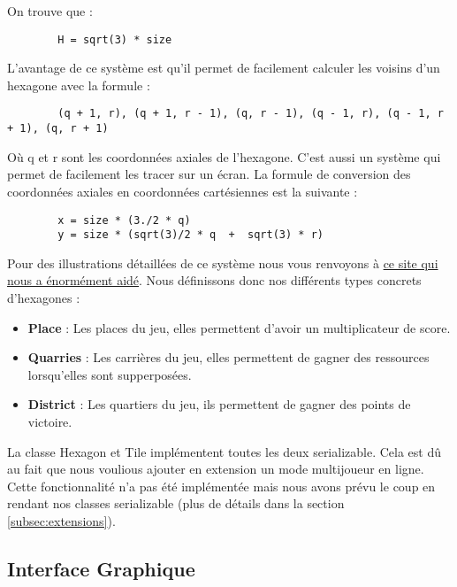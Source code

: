 \documentclass{article}
\begin{document}
    On trouve que :
    \begin{verbatim}
        H = sqrt(3) * size
    \end{verbatim}
    L'avantage de ce système est qu'il permet de facilement calculer les voisins d'un hexagone avec la formule :
    \begin{verbatim}
        (q + 1, r), (q + 1, r - 1), (q, r - 1), (q - 1, r), (q - 1, r + 1), (q, r + 1)
    \end{verbatim}
    Où q et r sont les coordonnées axiales de l'hexagone.
    C'est aussi un système qui permet de facilement les tracer sur un écran.
    La formule de conversion des coordonnées axiales en coordonnées cartésiennes est la suivante :
    \begin{verbatim}
        x = size * (3./2 * q)
        y = size * (sqrt(3)/2 * q  +  sqrt(3) * r)
    \end{verbatim}
    Pour des illustrations détaillées de ce système nous vous renvoyons à \href{https://www.redblobgames.com/grids/hexagons/}{ce site qui nous a énormément aidé}.
    Nous définissons donc nos différents types concrets d'hexagones :
    \begin{itemize}
        \item \textbf{Place} : Les places du jeu, elles permettent d'avoir un multiplicateur de score.
        \item \textbf{Quarries} : Les carrières du jeu, elles permettent de gagner des ressources lorsqu'elles sont supperposées.
        \item \textbf{District} : Les quartiers du jeu, ils permettent de gagner des points de victoire.
    \end{itemize}
    La classe Hexagon et Tile implémentent toutes les deux serializable. Cela est dû au fait que nous voulious ajouter en extension un mode multijoueur en ligne.
    Cette fonctionnalité n'a pas été implémentée mais nous avons prévu le coup en rendant nos classes serializable (plus de détails dans la section \ref{subsec:extensions}).
    \subsection{Interface Graphique}\label{subsec:interface-graphique}
\end{document}

